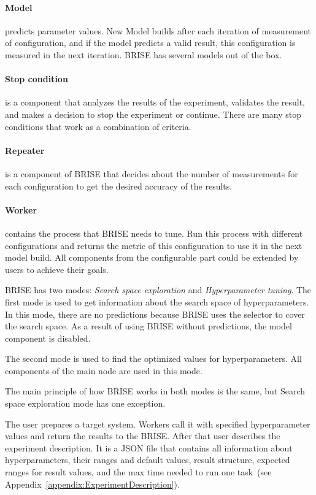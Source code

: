 \paragraph{Model} predicts parameter values. New Model builds after each iteration of measurement of configuration, and if the model predicts a valid result, this configuration is measured in the next iteration. BRISE has several models out of the box.
\paragraph{Stop condition} is a component that analyzes the results of the experiment, validates the result, and makes a decision to stop the experiment or continue. There are many stop conditions that work as a combination of criteria.
\paragraph{Repeater} is a component of BRISE that decides about the number of measurements for each configuration to get the desired accuracy of the results. 
\paragraph{Worker} contains the process that BRISE needs to tune. Run this process with different configurations and returns the metric of this configuration to use it in the next model build.
All components from the configurable part could be extended by users to achieve their goals.

BRISE has two modes: \textit{Search space exploration} and \textit{Hyperparameter tuning}.
The first mode is used to get information about the search space of hyperparameters. In this mode, there are no predictions because BRISE uses the selector to cover the search space. As a result of using BRISE without predictions, the model component is disabled.

The second mode is used to find the optimized values for hyperparameters. All components of the main node are used in this mode.

The main principle of how BRISE works in both modes is the same, but 
Search space exploration mode has one exception.

The user prepares a target system. Workers call it with specified hyperparameter values and return the results to the BRISE.
After that user describes the experiment description. It is a JSON file that contains all information about hyperparameters, their ranges and default values, result structure, expected ranges for result values, and the max time needed to run one task~(see Appendix~\ref{appendix:ExperimentDescription}).

